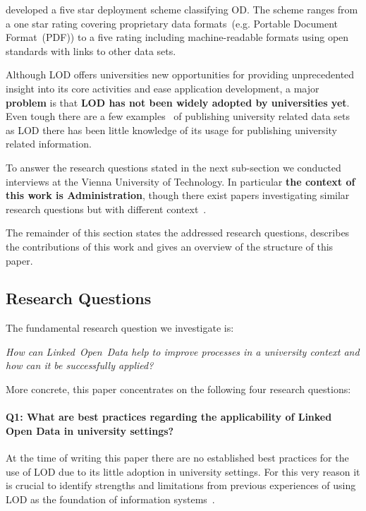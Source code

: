 \documentclass{article}
\begin{document}
\citet{artivle:bernerslee-t-2006-1} developed a five star deployment scheme classifying OD. The scheme ranges from a one star rating covering proprietary data formats~(e.g. Portable Document Format~(PDF)) to a five rating including machine-readable formats using open standards with links to other data sets.

Although LOD offers universities new opportunities for providing unprecedented insight into its core activities and ease application development, a major \textbf{problem} is that \textbf{LOD has not been widely adopted by universities yet}. Even tough there are a few examples~\cite{url:linked-universities-members} of publishing university related data sets as LOD there has been little knowledge of its usage for publishing university related information. 

To answer the research questions stated in the next sub-section we conducted interviews at the Vienna University of Technology. In particular \textbf{the context of this work is Administration}, though there exist papers investigating similar research questions but with different context~\cite{article:baronyai_publishing_2016, article:haller_publishing_2016}. 

The remainder of this section states the addressed research questions, describes the contributions of this work and gives an overview of the structure of this paper.

\subsection{Research Questions}
The fundamental research question we investigate is:
\begin{displayquote}
\textit{How can Linked~Open~Data help to improve processes in a university context and how can it be successfully applied?}
\end{displayquote}
More concrete, this paper concentrates on the following four research questions:
\paragraph{Q1: What are best practices regarding the applicability of Linked Open Data in university settings?}
At the time of writing this paper there are no established best practices for the use of LOD due to its little adoption in university settings. For this very reason it is crucial to identify strengths and limitations from previous experiences of using LOD as the foundation of information systems~\cite{url:linked-universities-members}. 
\end{document}

